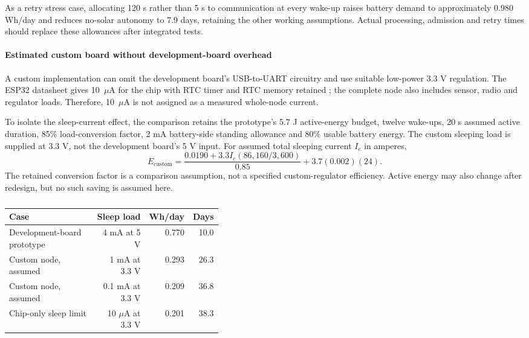 As a retry stress case, allocating 120 s rather than 5 s to communication at every wake-up raises battery demand to approximately 0.980 Wh/day and reduces no-solar autonomy to 7.9 days, retaining the other working assumptions. Actual processing, admission and retry times should replace these allowances after integrated tests.

\paragraph{Estimated custom board without development-board overhead}
A custom implementation can omit the development board's USB-to-UART circuitry and use suitable low-power 3.3 V regulation. The ESP32 datasheet gives 10~$\mu$A for the chip with RTC timer and RTC memory retained \cite{espressif_esp32_datasheet}; the complete node also includes sensor, radio and regulator loads. Therefore, 10~$\mu$A is not assigned as a measured whole-node current.

To isolate the sleep-current effect, the comparison retains the prototype's 5.7 J active-energy budget, twelve wake-ups, 20 s assumed active duration, 85\% load-conversion factor, 2 mA battery-side standing allowance and 80\% usable battery energy. The custom sleeping load is supplied at 3.3 V, not the development board's 5 V input. For assumed total sleeping current $I_c$ in amperes,
\[
E_{\mathrm{custom}}=
\frac{0.0190+3.3I_c(86{,}160/3{,}600)}{0.85}
+3.7(0.002)(24).
\]
The retained conversion factor is a comparison assumption, not a specified custom-regulator efficiency. Active energy may also change after redesign, but no such saving is assumed here.

\begin{table}[htbp]
\centering\small\color{black}
\caption{}
\label{tab:custom_board_energy}
\begin{tabular}{p{0.41\linewidth}rrr}
\toprule
Case & Sleep load & Wh/day & Days \\
\midrule
Development-board prototype & 4 mA at 5 V & 0.770 & 10.0 \\
Custom node, assumed & 1 mA at 3.3 V & 0.293 & 26.3 \\
Custom node, assumed & 0.1 mA at 3.3 V & 0.209 & 36.8 \\
Chip-only sleep limit & 10 $\mu$A at 3.3 V & 0.201 & 38.3 \\
\bottomrule
\end{tabular}
\end{table}
\FloatBarrier

